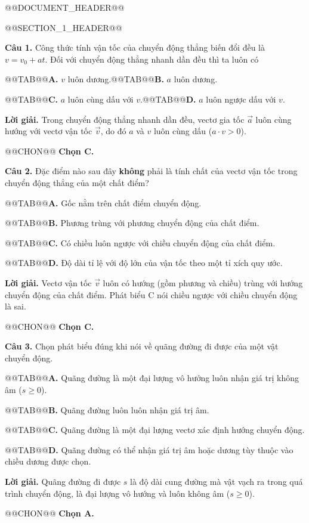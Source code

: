 \documentclass{article}
\begin{document}
@@DOCUMENT_HEADER@@

@@SECTION_1_HEADER@@

\textbf{Câu 1.} Công thức tính vận tốc của chuyển động thẳng biến đổi đều là $v = v_0 + at$. Đối với chuyển động thẳng nhanh dần đều thì ta luôn có

@@TAB@@\textbf{A.} $v$ luôn dương.@@TAB@@\textbf{B.} $a$ luôn dương.

@@TAB@@\textbf{C.} $a$ luôn cùng dấu với $v$.@@TAB@@\textbf{D.} $a$ luôn ngược dấu với $v$.

\textbf{Lời giải.} Trong chuyển động thẳng nhanh dần đều, vectơ gia tốc $\vec{a}$ luôn cùng hướng với vectơ vận tốc $\vec{v}$, do đó $a$ và $v$ luôn cùng dấu ($a \cdot v > 0$).

@@CHON@@ \textbf{Chọn C.}

\textbf{Câu 2.} Đặc điểm nào sau đây \textbf{không} phải là tính chất của vectơ vận tốc trong chuyển động thẳng của một chất điểm?

@@TAB@@\textbf{A.} Gốc nằm trên chất điểm chuyển động.

@@TAB@@\textbf{B.} Phương trùng với phương chuyển động của chất điểm.

@@TAB@@\textbf{C.} Có chiều luôn ngược với chiều chuyển động của chất điểm.

@@TAB@@\textbf{D.} Độ dài tỉ lệ với độ lớn của vận tốc theo một tỉ xích quy ước.

\textbf{Lời giải.} Vectơ vận tốc $\vec{v}$ luôn có hướng (gồm phương và chiều) trùng với hướng chuyển động của chất điểm. Phát biểu C nói chiều ngược với chiều chuyển động là sai.

@@CHON@@ \textbf{Chọn C.}

\textbf{Câu 3.} Chọn phát biểu đúng khi nói về quãng đường đi được của một vật chuyển động.

@@TAB@@\textbf{A.} Quãng đường là một đại lượng vô hướng luôn nhận giá trị không âm ($s \ge 0$).

@@TAB@@\textbf{B.} Quãng đường luôn luôn nhận giá trị âm.

@@TAB@@\textbf{C.} Quãng đường là một đại lượng vectơ xác định hướng chuyển động.

@@TAB@@\textbf{D.} Quãng đường có thể nhận giá trị âm hoặc dương tùy thuộc vào chiều dương được chọn.

\textbf{Lời giải.} Quãng đường đi được $s$ là độ dài cung đường mà vật vạch ra trong quá trình chuyển động, là đại lượng vô hướng và luôn không âm ($s \ge 0$).

@@CHON@@ \textbf{Chọn A.}
\end{document}
